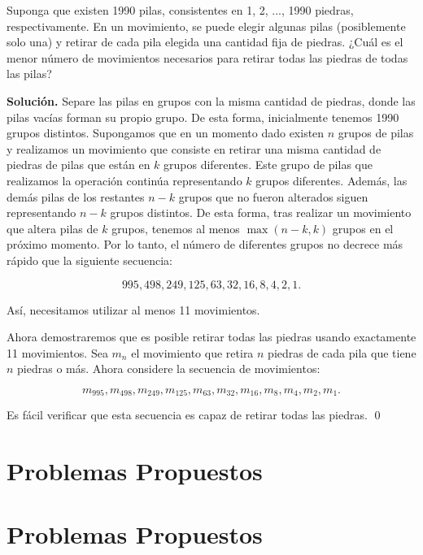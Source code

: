 \documentclass[11pt]{scrartcl}
\begin{document}
\begin{example}[URSS 1990]
Suponga que existen 1990 pilas, consistentes en 1, 2, ..., 1990 piedras, respectivamente. En un movimiento, se puede elegir algunas pilas (posiblemente solo una) y retirar de cada pila elegida una cantidad fija de piedras. ¿Cuál es el menor número de movimientos necesarios para retirar todas las piedras de todas las pilas?
\end{example}
\textbf{Solución.} Separe las pilas en grupos con la misma cantidad de piedras, donde las pilas vacías forman su propio grupo. De esta forma, inicialmente tenemos 1990 grupos distintos. Supongamos que en un momento dado existen \( n \) grupos de pilas y realizamos un movimiento que consiste en retirar una misma cantidad de piedras de pilas que están en \( k \) grupos diferentes. Este grupo de pilas que realizamos la operación continúa representando \( k \) grupos diferentes. Además, las demás pilas de los restantes \( n - k \) grupos que no fueron alterados siguen representando \( n - k \) grupos distintos. De esta forma, tras realizar un movimiento que altera pilas de \( k \) grupos, tenemos al menos \( \max(n-k, k) \) grupos en el próximo momento. Por lo tanto, el número de diferentes grupos no decrece más rápido que la siguiente secuencia:

\[
995, 498, 249, 125, 63, 32, 16, 8, 4, 2, 1.
\]

Así, necesitamos utilizar al menos 11 movimientos.

Ahora demostraremos que es posible retirar todas las piedras usando exactamente 11 movimientos. Sea \( m_n \) el movimiento que retira \( n \) piedras de cada pila que tiene \( n \) piedras o más. Ahora considere la secuencia de movimientos:

\[
m_{995}, m_{498}, m_{249}, m_{125}, m_{63}, m_{32}, m_{16}, m_{8}, m_{4}, m_{2}, m_{1}.
\]

Es fácil verificar que esta secuencia es capaz de retirar todas las piedras. \qed

\section{Problemas Propuestos}


\section*{Problemas Propuestos}
\end{document}
